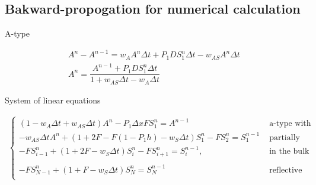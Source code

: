 \documentclass[10pt, oneside]{article}
\begin{document}
\subsection{Bakward-propogation for numerical calculation}
A-type
\begin{linenomath}
	\begin{align} 
	\label{eq:s-a-type-revertants}
	A^n-A^{n-1}=w_AA^n\Delta t+P_1DS_1^{n}\Delta t-w_{AS}A^n \Delta t \\
	A^n=\dfrac{A^{n-1}+P_1DS_1^{n}\Delta t}{1+w_{AS}\Delta t-w_A\Delta t}
	\end{align}
\end{linenomath}

System of linear equations
\begin{linenomath}
	\begin{align} 
	\label{eq:s-bacwardS}
	\begin{cases}
	(1-w_A\Delta t+w_{AS}\Delta t) A^n-P_1\Delta x F S^n_1=A^{n-1}&\text{ a-type with reveltants}\\
	-w_{AS}\Delta t A^n+(1+2F-F(1-P_1h)-w_S\Delta t)S^n_1-FS^n_2=S^{n-1}_1 &\text{ partially adsorbing boarder}\\
	-FS^n_{i-1}+(1+2F-w_S\Delta t)S^n_{i}-FS^n_{i+1}=S^{n-1}_i,  &\text{ in the bulk}\\\\ 
	-FS^n_{N-1}+(1+F-w_S\Delta t)S^n_N=S^{n-1}_N &\text{ reflective boarder}\\
	\end{cases}
	\end{align}
\end{linenomath}


\label{key}
\end{document}
